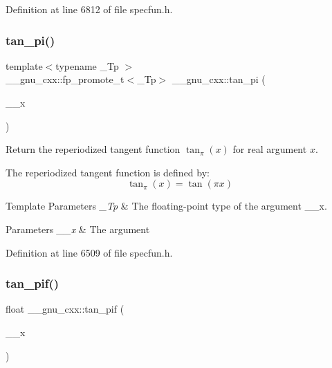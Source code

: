 Definition at line 6812 of file specfun.\+h.

\mbox{\label{group__gnu__math__spec__func_ga12855bd62fe6a955ef0d1d5e92c85ba9}} 
\subsubsection{\texorpdfstring{tan\+\_\+pi()}{tan\_pi()}}
{\footnotesize\ttfamily template$<$typename \+\_\+\+Tp $>$ \\
\+\_\+\+\_\+gnu\+\_\+cxx\+::fp\+\_\+promote\+\_\+t$<$\+\_\+\+Tp$>$ \+\_\+\+\_\+gnu\+\_\+cxx\+::tan\+\_\+pi (\begin{DoxyParamCaption}\item[{\+\_\+\+Tp}]{\+\_\+\+\_\+x }\end{DoxyParamCaption})\hspace{0.3cm}{\ttfamily [inline]}}

Return the reperiodized tangent function $ \tan_\pi(x) $ for real argument $ x $.

The reperiodized tangent function is defined by\+: \[ \tan_\pi(x) = \tan(\pi x) \]


\begin{DoxyTemplParams}{Template Parameters}
{\em \+\_\+\+Tp} & The floating-\/point type of the argument {\ttfamily \+\_\+\+\_\+x}. \\
\hline
\end{DoxyTemplParams}

\begin{DoxyParams}{Parameters}
{\em \+\_\+\+\_\+x} & The argument \\
\hline
\end{DoxyParams}


Definition at line 6509 of file specfun.\+h.

\mbox{\label{group__gnu__math__spec__func_gaab32e2d76da811451e84232320ddf80c}} 
\subsubsection{\texorpdfstring{tan\+\_\+pif()}{tan\_pif()}}
{\footnotesize\ttfamily float \+\_\+\+\_\+gnu\+\_\+cxx\+::tan\+\_\+pif (\begin{DoxyParamCaption}\item[{float}]{\+\_\+\+\_\+x }\end{DoxyParamCaption})\hspace{0.3cm}{\ttfamily [inline]}}

